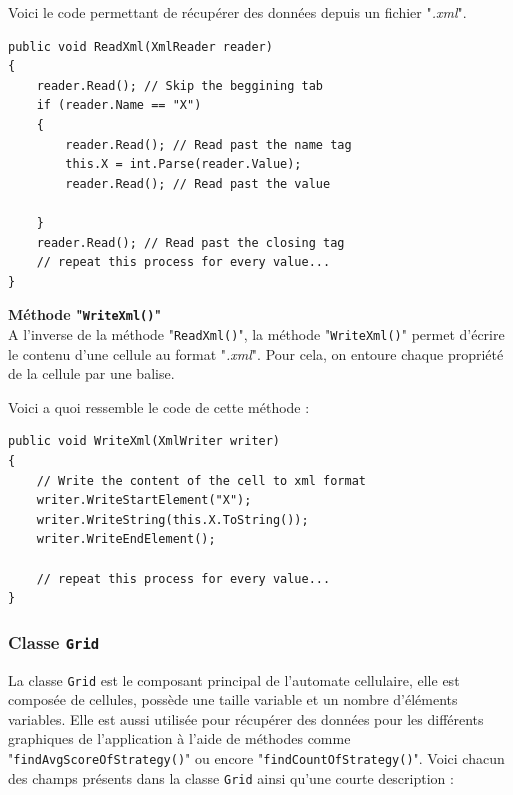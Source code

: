 \documentclass[a4paper, french]{article}
\begin{document}
Voici le code permettant de récupérer des données depuis un fichier "\textit{.xml}".

\begin{lstlisting}
public void ReadXml(XmlReader reader)
{
    reader.Read(); // Skip the beggining tab
    if (reader.Name == "X")
    {
        reader.Read(); // Read past the name tag
        this.X = int.Parse(reader.Value);
        reader.Read(); // Read past the value 

    }
    reader.Read(); // Read past the closing tag
    // repeat this process for every value...
}
\end{lstlisting}


\textbf{Méthode "\texttt{WriteXml()}"}\\
A l'inverse de la méthode "\texttt{ReadXml()}", la méthode "\texttt{WriteXml()}" permet d'écrire le contenu d'une cellule au format "\textit{.xml}". Pour cela, on entoure chaque propriété de la cellule par une balise.

Voici a quoi ressemble le code de cette méthode :

\begin{lstlisting}
public void WriteXml(XmlWriter writer)
{
    // Write the content of the cell to xml format
    writer.WriteStartElement("X");
    writer.WriteString(this.X.ToString());
    writer.WriteEndElement();
    
    // repeat this process for every value...
}
\end{lstlisting}

\pagebreak
\subsubsection{Classe \texttt{Grid}}
La classe \texttt{Grid} est le composant principal de l'automate cellulaire, elle est composée de cellules, possède une taille variable et un nombre d'éléments variables. Elle est aussi utilisée pour récupérer des données pour les différents graphiques de l'application à l'aide de méthodes comme "\texttt{findAvgScoreOfStrategy()}" ou encore "\texttt{findCountOfStrategy()}". Voici chacun des champs présents dans la classe \texttt{Grid} ainsi qu'une courte description : 
\end{document}
